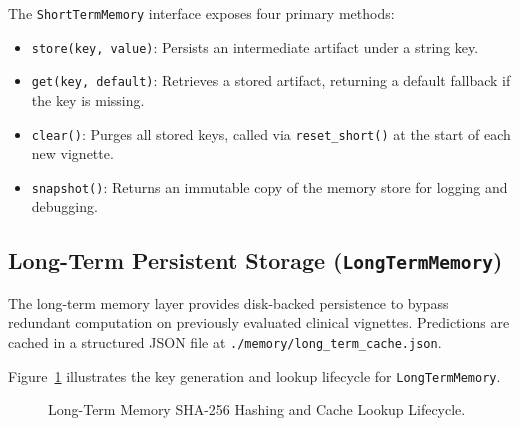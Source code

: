 The \texttt{ShortTermMemory} interface exposes four primary methods:
\begin{itemize}
    \item \texttt{store(key, value)}: Persists an intermediate artifact under a string key.
    \item \texttt{get(key, default)}: Retrieves a stored artifact, returning a default fallback if the key is missing.
    \item \texttt{clear()}: Purges all stored keys, called via \texttt{reset\_short()} at the start of each new vignette.
    \item \texttt{snapshot()}: Returns an immutable copy of the memory store for logging and debugging.
\end{itemize}

\subsection{Long-Term Persistent Storage (\texttt{LongTermMemory})}

The long-term memory layer provides disk-backed persistence to bypass redundant computation on previously evaluated clinical vignettes. Predictions are cached in a structured JSON file at \texttt{./memory/long\_term\_cache.json}.

Figure~\ref{fig:long_term_cache} illustrates the key generation and lookup lifecycle for \texttt{LongTermMemory}.

\begin{figure}[htbp]
\centering
{}
\caption{Long-Term Memory SHA-256 Hashing and Cache Lookup Lifecycle.}
\label{fig:long_term_cache}
\end{figure}

